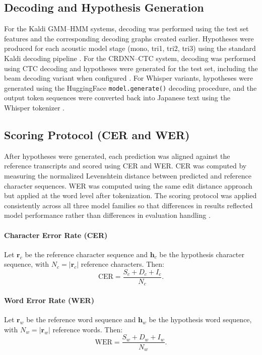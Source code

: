 \subsection{Decoding and Hypothesis Generation}
For the Kaldi GMM--HMM systems, decoding was performed using the test set features and the corresponding decoding graphs created earlier. Hypotheses were produced for each acoustic model stage (mono, tri1, tri2, tri3) using the standard Kaldi decoding pipeline \parencite{kaldi2011}. For the CRDNN--CTC system, decoding was performed using CTC decoding and hypotheses were generated for the test set, including the beam decoding variant when configured \parencite{speechbrain_v1}. For Whisper variants, hypotheses were generated using the HuggingFace \texttt{model.generate()} decoding procedure, and the output token sequences were converted back into Japanese text using the Whisper tokenizer \parencite{wolf2020huggingfacestransformersstateoftheartnatural}.

\subsection{Scoring Protocol (CER and WER)}
After hypotheses were generated, each prediction was aligned against the reference transcripts and scored using CER and WER. CER was computed by measuring the normalized Levenshtein distance between predicted and reference character sequences. WER was computed using the same edit distance approach but applied at the word level after tokenization. The scoring protocol was applied consistently across all three model families so that differences in results reflected model performance rather than differences in evaluation handling \parencite{jiwer_2025}.

\paragraph{Character Error Rate (CER)}
Let $\mathbf{r}_c$ be the reference character sequence and $\mathbf{h}_c$ be the
hypothesis character sequence, with $N_c = |\mathbf{r}_c|$ reference characters.
Then:
\begin{equation}
\mathrm{CER} = \frac{S_c + D_c + I_c}{N_c}.
\end{equation}

\paragraph{Word Error Rate (WER)}
Let $\mathbf{r}_w$ be the reference word sequence and $\mathbf{h}_w$ be the
hypothesis word sequence, with $N_w = |\mathbf{r}_w|$ reference words. Then:
\begin{equation}
\mathrm{WER} = \frac{S_w + D_w + I_w}{N_w}.
\end{equation}

